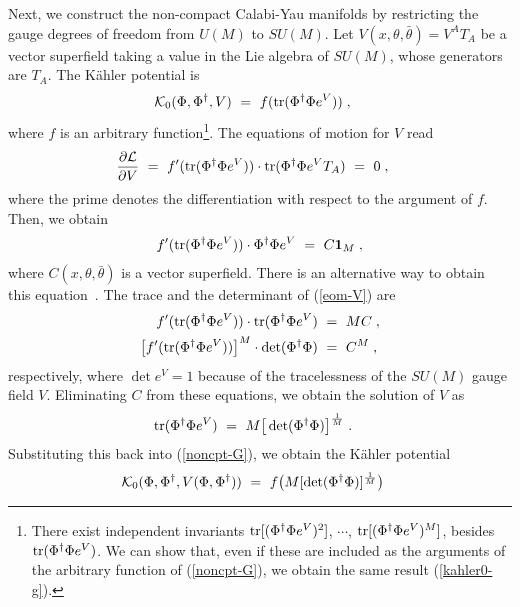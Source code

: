 \documentclass[a4paper,11pt]{article}
\newcommand{\Pd}[2]{\frac{\partial{#1}}{\partial{#2}}}
\newcommand{\kahler}{K\"{a}hler }
\newcommand{\bsubeq}{\begin{subequations}}
\newcommand{\esubeq}{\end{subequations}}
\newcommand{\tr}{{\rm tr}}
\begin{document}
{Next, we construct the non-compact Calabi-Yau manifolds
by restricting the gauge degrees of freedom from $U(M)$ to $SU(M)$.
Let $V(x,\theta,\bar{\theta}) = V^A T_A$ be a vector superfield 
taking a value in the Lie algebra of $SU(M)$, 
whose generators are $T_A$. 
The \kahler potential is
\begin{align}
 {\cal K}_0 (\Phi, \Phi^{\dagger}, V) 
 \ &= \ f (\tr (\Phi^{\dagger} \Phi e^V)) \; , 
\label{noncpt-G}
\end{align}
where $f$ is an arbitrary function\footnote{There exist independent
invariants 
${\rm tr}[(\Phi^{\dagger} \Phi e^V)^2]$, $\cdots$,
${\rm tr}[(\Phi^{\dagger} \Phi e^V)^M]$, 
besides ${\rm tr}(\Phi^{\dagger} \Phi e^V)$.
We can show that, even if these are included as the arguments of 
the arbitrary function of (\ref{noncpt-G}), 
we obtain the same result (\ref{kahler0-g}).
}.  
The equations of motion for $V$ read 
\begin{align}
\Pd{{\cal L}}{V} 
\ &= \ 
f' (\tr (\Phi^{\dagger} \Phi e^V)) 
\cdot \tr (\Phi^{\dagger} \Phi e^V T_A )
\ = \ 
0 \; , 
\end{align}
where the prime denotes the differentiation with respect to the
argument of $f$.
Then, we obtain  
\begin{align}
 f' (\tr (\Phi^{\dagger} \Phi e^V)) 
 \cdot \Phi^{\dagger} \Phi e^V 
 \ = \ C {\bf 1}_M  \; ,\label{eom-V}
\end{align}
where $C(x,\theta,\bar{\theta})$ is a vector superfield.
There is an alternative way to obtain 
this equation~\cite{HKN3}.  
The trace and the determinant of (\ref{eom-V}) are
\bsubeq
\begin{align}
f' (\tr(\Phi^{\dagger} \Phi e^V)) \cdot \tr (\Phi^{\dagger} \Phi e^V) 
\ &= \ 
M C \; , \\
\big[ f' (\tr (\Phi^{\dagger} \Phi e^V)) \big]^M 
\cdot \det (\Phi^{\dagger} \Phi) 
\ &= \ 
C^M \; ,
\end{align}
\esubeq
respectively, where $\det e^V = 1$
because of the tracelessness of the $SU(M)$ gauge field $V$.
Eliminating $C$ from these equations,
we obtain the solution of $V$ as
\begin{align}
\tr (\Phi^{\dagger} \Phi e^V) 
\ &= \ 
M \big[ \det (\Phi^{\dagger} \Phi) \big]^{\frac{1}{M}} \; .
\end{align}
Substituting this back into (\ref{noncpt-G}), 
we obtain the \kahler potential
\begin{align}
{\cal K}_0 (\Phi, \Phi^{\dagger}, V(\Phi, \Phi^{\dagger})) 
\ &= \ 
f \big( M [ \det (\Phi^{\dagger} \Phi) ]^{\frac{1}{M}} \big) 

\end{align}}
\end{document}
